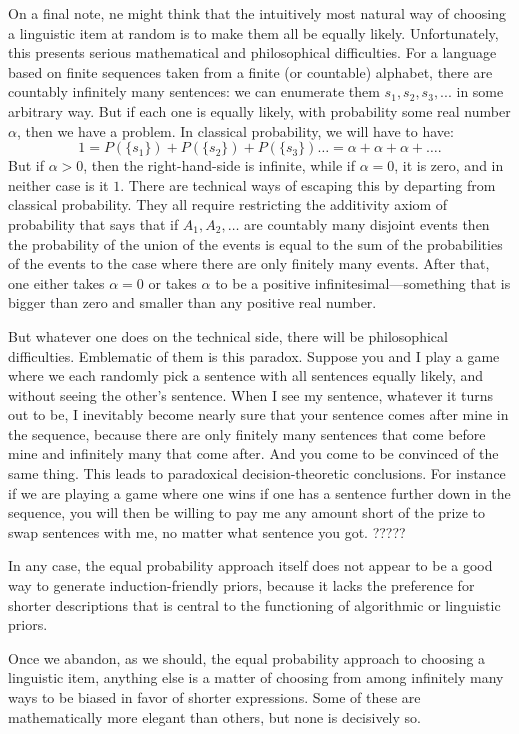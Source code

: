 On a final note, ne might think that the intuitively most natural way of choosing a linguistic item at random is to make them
all be equally likely. Unfortunately, this presents serious mathematical and philosophical difficulties. For a language
based on finite sequences taken from a finite (or countable) alphabet, there are countably infinitely many sentences:
we can enumerate them $s_1,s_2,s_3,...$ in some arbitrary way. But if each one is equally likely, with probability some
real number $\alpha$, then we have a problem. In classical probability, we will have to have:
$$
    1=P(\{s_1\})+P(\{s_2\})+P(\{s_3\})\dots = \alpha+\alpha+\alpha+\dots.
$$
But if $\alpha>0$, then the right-hand-side is infinite, while if $\alpha=0$, it is zero, and in neither case is it $1$.
There are technical ways of escaping this by departing from classical probability. They all require restricting the 
additivity axiom of probability that says that if $A_1,A_2,\dots$ are countably many disjoint events then the probability 
of the union of the events is equal to the sum of the probabilities of the events to the case where there are only finitely
many events. After that, one either takes $\alpha=0$ or takes $\alpha$ to be a positive infinitesimal---something that is bigger 
than zero and smaller than any positive real number. 

But whatever one does on the technical side, there will be philosophical
difficulties. Emblematic of them is this paradox. Suppose you and I play a game where we each randomly pick a sentence with
all sentences equally likely, and without seeing the other's sentence. When I see my sentence, whatever it turns out to be, I inevitably become nearly sure that your 
sentence comes after mine in the sequence, because there are only finitely many sentences that come before mine and infinitely
many that come after. And you come to be convinced of the same thing. This leads to paradoxical decision-theoretic conclusions.
For instance if we are playing a game where one wins if one has a sentence further down in the sequence, you will then be willing to pay
me any amount short of the prize to swap sentences with me, no matter what sentence you got. ?????

In any case, the equal probability approach itself does not appear to be a good way to generate induction-friendly priors, 
because it lacks the preference for shorter descriptions that is central to the functioning of algorithmic or linguistic
priors. 

Once we abandon, as we should, the equal probability approach to choosing a linguistic item, anything else is a matter 
of choosing from among infinitely many ways to be biased in favor of shorter expressions. Some of these are mathematically
more elegant than others, but none is decisively so.

